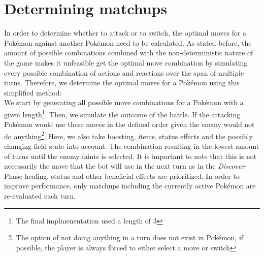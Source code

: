 \section{Determining matchups}
\label{sec:determine-matchups}
In order to determine whether to attack or to switch, the optimal moves for a Pokémon against
another Pokémon need to be calculated. As stated before, the amount of possible combinations combined with the non-deterministic
nature of the game makes it unfeasible get the optimal move combination by simulating every possible combination of 
actions and reactions over the span of multiple turns. Therefore, we determine the optimal moves for a Pokémon using 
this simplified method: \\
We start by generating all possible move combinations for a Pokémon with a given length\footnote{The final implmenentation
used a length of 3}. Then, we simulate the outcome
of the battle. If the attacking Pokémon would use these moves in the defined order given the enemy would not do 
anything\footnote{The option of not doing anything in a turn does not exist in Pokémon, if possible, the player is always 
forced to either select a move or switch}. Here, we also take boosting, items, status effects and the possibly changing
field state into account.
The combination resulting in the lowest amount of turns until the enemy faints is selected. 
It is important to note that this is not necessarily the move that the bot will use in the next turn as in the 
\textit{Discover}-Phase healing, status and other beneficial effects are prioritized. In order to improve 
performance, only matchups including the currently active Pokémon are re-evaluated each turn.

